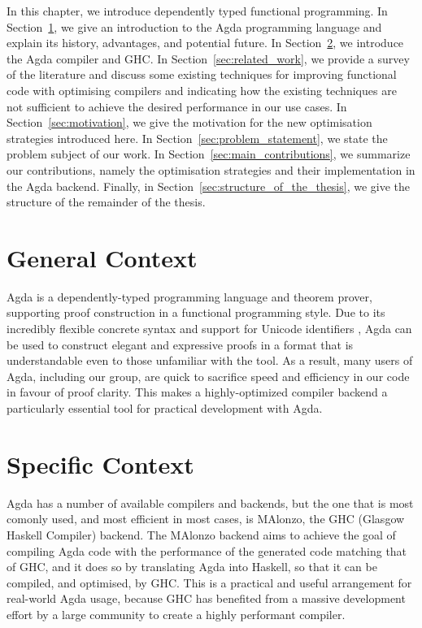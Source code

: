 In this chapter, we introduce dependently typed functional programming. In Section~\ref{sec:general_context}, we give an introduction to the Agda programming language and explain its history, advantages, and potential future. In Section~\ref{sec:specific_context}, we introduce the Agda compiler and GHC. In Section~\ref{sec:related_work}, we provide a survey of the literature and discuss some existing techniques for improving functional code with optimising compilers and indicating how the existing techniques are not sufficient to achieve the desired performance in our use cases. In Section~\ref{sec:motivation}, we give the motivation for the new optimisation strategies introduced here. In Section~\ref{sec:problem_statement}, we state the problem subject of our work. In Section~\ref{sec:main_contributions}, we summarize our contributions, namely the optimisation strategies and their implementation in the Agda backend. Finally, in Section~\ref{sec:structure_of_the_thesis}, we give the structure of the remainder of the thesis.

\section{General Context}
\label{sec:general_context}

Agda \cite{norell2007} is a dependently-typed programming language and theorem prover, supporting proof construction in a functional programming style. Due to its incredibly flexible concrete syntax and support for Unicode identifiers \cite{bove2009}, Agda can be used to construct elegant and expressive proofs in a format that is understandable even to those unfamiliar with the tool. As a result, many users of Agda, including our group, are quick to sacrifice speed and efficiency in our code in favour of proof clarity. This makes a highly-optimized compiler backend a particularly essential tool for practical development with Agda.


\section{Specific Context}
\label{sec:specific_context}

Agda has a number of available compilers and backends, but the one that is most comonly used, and most efficient in most cases, is MAlonzo, the GHC (Glasgow Haskell Compiler) backend.\cite{benke2007} The MAlonzo backend aims to achieve the goal of compiling Agda code with the performance of the generated code matching that of GHC, and it does so by translating Agda into Haskell, so that it can be compiled, and optimised, by GHC. This is a practical and useful arrangement for real-world Agda usage, because GHC has benefited from a massive development effort by a large community to create a highly performant compiler.\cite{benke2007}

